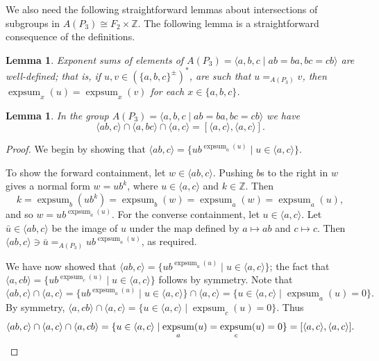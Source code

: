 \documentclass[11pt]{amsart}
\newtheorem{lem}[theorem]{Lemma}
\theoremstyle{definition}
\numberwithin{theorem}{section}
\DeclareMathOperator{\expsum}{expsum}
\newcommand{\Z}{\mathbb{Z}}
\begin{document}
We also need the following straightforward lemmas about intersections of subgroups in $A(P_3) \cong F_2 \times \Z$. The following lemma is a straightforward consequence of the definitions.
  
\begin{lem} Exponent sums of elements of \(A(P_3) = \langle a, b, c \mid ab = ba, bc = cb \rangle\) are well-defined; that is, if \(u, v \in (\{a, b, c\}^\pm)^\ast\), are such that \(u = _{A(P_3)} v\), then \(\expsum_x(u) = \expsum_x(v)\) for each \(x \in \{a, b, c\}\). \end{lem}

\begin{lem}\label{Lem:DPSGAP3}
In the group \(A(P_3) = \langle a, b, c \mid ab = ba, bc = cb \rangle\) we have
\[
\langle ab, c \rangle \cap
    \langle a, bc \rangle \cap \langle a, c \rangle = [\langle a, c \rangle,
    \langle a, c \rangle].
\]
\end{lem}
\begin{proof}
    We begin by showing that \(\langle ab, c \rangle =
    \{u b^{\expsum_a(u)} \mid u \in \langle a, c \rangle\}\).

    To show the forward containment, let \(w \in \langle ab, c \rangle\). Pushing
    \(b\)s to the right in \(w\) gives a normal form \(w = ub^k\), where
    \(u \in \langle a, c \rangle\) and \(k \in \mathbb{Z}\). Then
    \[
        k = \expsum_b(ub^k) = \expsum_b(w) = \expsum_a(w) = \expsum_a(u),
    \]
    and so \(w = ub^{\expsum_a(u)}\). For the converse containment, let
    \(u \in \langle a, c \rangle\). Let \(\bar{u} \in \langle ab, c \rangle\)
    be the image of \(u\) under the map defined by \(a \mapsto ab\) and \(c \mapsto c\).
    Then \(\langle ab, c \rangle \ni \bar{u} =_{A(P_3)} ub^{\expsum_a(u)}\), as required.

    We have now showed that \(\langle ab, c \rangle =
    \{u b^{\expsum_a(u)} \mid u \in \langle a, c \rangle\}\); the fact that
    \(\langle a, cb \rangle =
    \{u b^{\expsum_c(u)} \mid u \in \langle a, c \rangle\}\) follows by symmetry. Note that
    \[
        \langle ab, c \rangle \cap \langle a, c \rangle = \{u b^{\expsum_a(u)} \mid u \in \langle a, c \rangle\} \cap \langle a, c \rangle
        = \{u \in \langle a, c \rangle \mid \expsum_a(u) = 0\}.
    \]
    By symmetry, \(\langle a, cb \rangle \cap \langle a, c \rangle = \{u \in \langle a, c
    \rangle \mid \expsum_c(u) = 0\}\). Thus
    \[
        \langle ab, c \rangle \cap \langle a, c \rangle \cap \langle a, cb \rangle
        = \{u \in \langle a, c
    \rangle \mid \expsum_a(u) = \expsum_c(u) = 0\} = [\langle a, c \rangle, \langle
    a, c \rangle]. \qedhere
    \] 
\end{proof}
\end{document}
